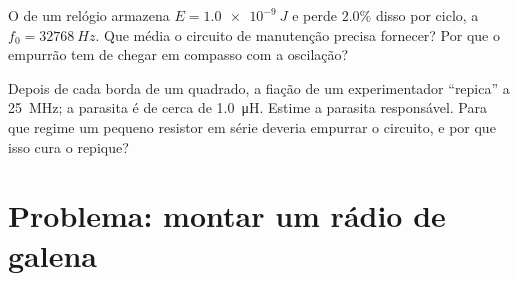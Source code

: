 \begin{exercise}[$\star\star\star$]\label{exo:g12:rlc-oscillations:14}
O  de um relógio armazena $E = \qty{1.0e-9}{J}$ e perde $2.0\%$ disso por
ciclo, a $f_0 = \qty{32768}{Hz}$. Que  média o circuito de manutenção precisa
fornecer? Por que o empurrão tem de chegar em compasso com a oscilação?
\end{exercise}

\begin{exercise}[$\star\star\star$]\label{exo:g12:rlc-oscillations:15}
Depois de cada borda de um  quadrado, a fiação de um experimentador ``repica'' a
\qty{25}{MHz}; a  parasita é de cerca de \qty{1.0}{\micro H}. Estime a
 parasita responsável. Para que regime um pequeno resistor em série deveria
empurrar o circuito, e por que isso cura o repique?
\end{exercise}

\section{Problema: montar um rádio de galena}

